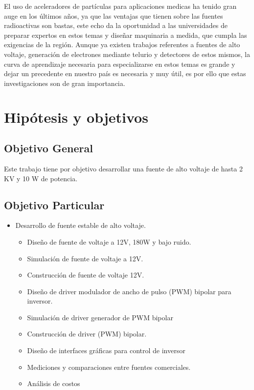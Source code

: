 El uso de aceleradores de partículas para aplicaciones medicas ha tenido gran auge en los últimos años, ya que las ventajas que tienen sobre las fuentes radioactivas son bastas, este echo da la oportunidad a las universidades de preparar expertos en estos temas y diseñar maquinaria a medida, que cumpla las exigencias de la región. Aunque ya existen trabajos referentes a fuentes de alto voltaje, generación de electrones mediante telurio y detectores de estos mismos, la curva de aprendizaje necesaria para especializarse en estos temas es grande y dejar un precedente en nuestro país es necesaria y muy útil, es por ello que estas
investigaciones son de gran importancia.
\newpage
\section{Hipótesis y objetivos}

\subsection{Objetivo General}

Este trabajo tiene por objetivo desarrollar una fuente de alto voltaje de hasta 2 KV y 10 W de potencia.

\subsection{Objetivo Particular}


\begin{itemize}
\item Desarrollo de fuente estable de alto voltaje.
\begin{itemize}
\item Diseño de fuente de voltaje a 12V, 180W y bajo ruido.
\item Simulación de fuente de voltaje a 12V.
\item Construcción de fuente de voltaje 12V.
\item Diseño de driver modulador de ancho de pulso (PWM) bipolar para inversor.
\item Simulación de driver generador de PWM bipolar
\item Construcción de driver (PWM) bipolar.
\item Diseño de interfaces gráficas para control de inversor
\item Mediciones y comparaciones entre fuentes comerciales.
\item Análisis de costos
\end{itemize}  
\end{itemize}

